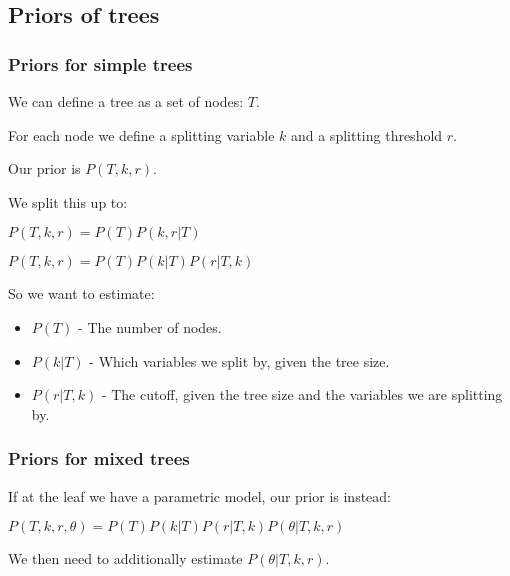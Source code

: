 
\subsection{Priors of trees}

\subsubsection{Priors for simple trees}

We can define a tree as a set of nodes: \(T\).

For each node we define a splitting variable \(k\) and a splitting threshold \(r\).

Our prior is \(P(T, k, r)\).

We split this up to:

\(P(T, k, r)=P(T)P(k, r|T)\)

\(P(T, k, r)=P(T)P(k|T)P(r|T, k)\)

So we want to estimate:

\begin{itemize}
\item \(P(T)\) - The number of nodes.
\item \(P(k|T)\) - Which variables we split by, given the tree size.
\item \(P(r|T, k)\) - The cutoff, given the tree size and the variables we are splitting by.
\end{itemize}

\subsubsection{Priors for mixed trees}

If at the leaf we have a parametric model, our prior is instead:

\(P(T, k, r, \theta )=P(T)P(k|T)P(r|T, k)P(\theta | T, k, r)\)

We then need to additionally estimate \(P(\theta | T, k, r)\).

